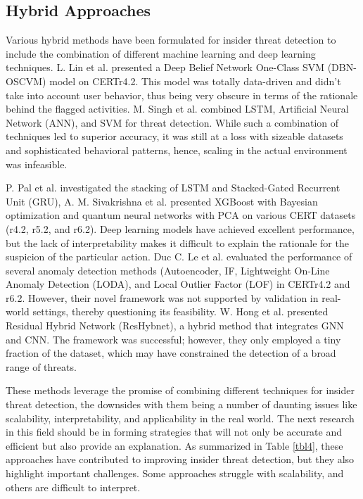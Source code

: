 \subsection{Hybrid Approaches}
Various hybrid methods have been formulated for insider threat detection to include the combination of different machine learning and deep learning techniques. 
L. Lin et al. \cite{lin2017insider} presented a Deep Belief Network One-Class SVM (DBN-OSCVM) model on CERTr4.2. This model was totally data-driven and didn't take into account user behavior, thus being very obscure in terms of the rationale behind the flagged activities. M. Singh et al. \cite{singh2023user} combined LSTM, Artificial Neural Network (ANN), and SVM for threat detection. While such a combination of techniques led to superior accuracy, it was still at a loss with sizeable datasets and sophisticated behavioral patterns, hence, scaling in the actual environment was infeasible.

P. Pal et al. \cite{pal2023temporal} investigated the stacking of LSTM and Stacked-Gated Recurrent Unit (GRU), A. M. Sivakrishna et al. \cite{sivakrishna2025efficient,sivakrishna2025temporal} presented XGBoost with Bayesian optimization and quantum neural networks with PCA on various CERT datasets (r4.2, r5.2, and r6.2). Deep learning models have achieved excellent performance, but the lack of interpretability makes it difficult to explain the rationale for the suspicion of the particular action. Duc C. Le et al. \cite{le2021anomaly} evaluated the performance of several anomaly detection methods (Autoencoder, IF, Lightweight On-Line Anomaly Detection (LODA), and Local Outlier Factor (LOF) in CERTr4.2 and r6.2. However, their novel framework was not supported by validation in real-world settings, thereby questioning its feasibility. W. Hong et al. \cite{hong2023graph} presented Residual Hybrid Network (ResHybnet), a hybrid method that integrates GNN and CNN. The framework was successful; however, they only employed a tiny fraction of the dataset, which may have constrained the detection of a broad range of threats.

These methods leverage the promise of combining different techniques for insider threat detection, the downsides with them being a number of daunting issues like scalability, interpretability, and applicability in the real world. The next research in this field should be in forming strategies that will not only be accurate and efficient but also provide an explanation.
As summarized in Table \ref{tbl4}, these approaches have contributed to improving insider threat detection, but they also highlight important challenges. Some approaches struggle with scalability, and others are difficult to interpret.


